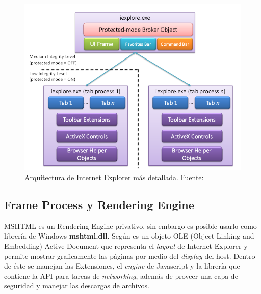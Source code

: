     \begin{figure}[h!t]
        \centering
        \includegraphics[scale=0.5]{figures/11_IE8andLooselyCoupledIELCIE_2.png}
        \caption{Arquitectura de Internet Explorer más detallada. Fuente: \cite{IE8LCIE}}
        \label{fig:archIE2}
    \end{figure}

    \subsection{Frame Process y Rendering Engine}   
        \label{chap2:Trident}
        MSHTML es un Rendering Engine privativo, sin embargo es posible usarlo como librería de Windows \textbf{mshtml.dll}. Según \cite{Crowley2010} es un objeto OLE (Object Linking and Embedding) Active Document que representa el \textit{layout} de Internet Explorer y permite mostrar graficamente las páginas por medio del \textit{display} del host. Dentro de éste se manejan las Extensiones, el \textit{engine} de Javascript y la librería que contiene la API para tareas de \textit{networking}, además de proveer una capa de seguridad y manejar las descargas de archivos.




